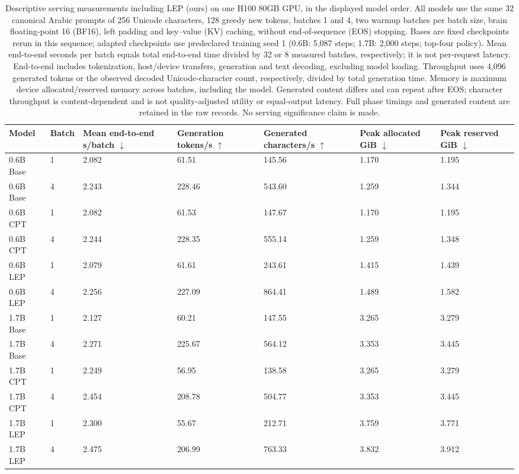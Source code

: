 \begin{table}[t]
\centering
\small
\setlength{\tabcolsep}{4pt}
\begin{tabular}{@{}lllllll@{}}
\toprule
Model & Batch & \shortstack{Mean end-to-end\\s/batch $\downarrow$} & \shortstack{Generation\\tokens/s $\uparrow$} & \shortstack{Generated\\characters/s $\uparrow$} & \shortstack{Peak allocated\\GiB $\downarrow$} & \shortstack{Peak reserved\\GiB $\downarrow$} \\
\midrule
0.6B Base & 1 & 2.082 & 61.51 & 145.56 & 1.170 & 1.195 \\
0.6B Base & 4 & 2.243 & 228.46 & 543.60 & 1.259 & 1.344 \\
0.6B CPT & 1 & 2.082 & 61.53 & 147.67 & 1.170 & 1.195 \\
0.6B CPT & 4 & 2.244 & 228.35 & 555.14 & 1.259 & 1.348 \\
0.6B LEP & 1 & 2.079 & 61.61 & 243.61 & 1.415 & 1.439 \\
0.6B LEP & 4 & 2.256 & 227.09 & 864.41 & 1.489 & 1.582 \\
1.7B Base & 1 & 2.127 & 60.21 & 147.55 & 3.265 & 3.279 \\
1.7B Base & 4 & 2.271 & 225.67 & 564.12 & 3.353 & 3.445 \\
1.7B CPT & 1 & 2.249 & 56.95 & 138.58 & 3.265 & 3.279 \\
1.7B CPT & 4 & 2.454 & 208.78 & 504.77 & 3.353 & 3.445 \\
1.7B LEP & 1 & 2.300 & 55.67 & 212.71 & 3.759 & 3.771 \\
1.7B LEP & 4 & 2.475 & 206.99 & 763.33 & 3.832 & 3.912 \\
\bottomrule
\end{tabular}
\caption{Descriptive serving measurements including LEP (ours) on one H100 80GB GPU, in the displayed model order. All models use the same 32 canonical Arabic prompts of 256 Unicode characters, 128 greedy new tokens, batches 1 and 4, two warmup batches per batch size, brain floating-point 16 (BF16), left padding and key--value (KV) caching, without end-of-sequence (EOS) stopping. Bases are fixed checkpoints rerun in this sequence; adapted checkpoints use predeclared training seed 1 (0.6B: 5,087 steps; 1.7B: 2,000 steps; top-four policy). Mean end-to-end seconds per batch equals total end-to-end time divided by 32 or 8 measured batches, respectively; it is not per-request latency. End-to-end includes tokenization, host/device transfers, generation and text decoding, excluding model loading. Throughput uses 4,096 generated tokens or the observed decoded Unicode-character count, respectively, divided by total generation time. Memory is maximum device allocated/reserved memory across batches, including the model. Generated content differs and can repeat after EOS; character throughput is content-dependent and is not quality-adjusted utility or equal-output latency. Full phase timings and generated content are retained in the raw records. No serving significance claim is made.}
\label{tab:rebuttal-serving}
\end{table}
